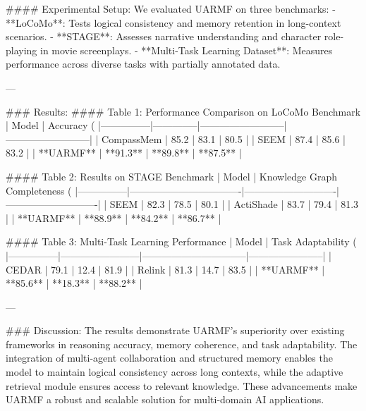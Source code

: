 #### Experimental Setup:
We evaluated UARMF on three benchmarks:
- **LoCoMo**: Tests logical consistency and memory retention in long-context scenarios.
- **STAGE**: Assesses narrative understanding and character role-playing in movie screenplays.
- **Multi-Task Learning Dataset**: Measures performance across diverse tasks with partially annotated data.

---

### Results:
#### Table 1: Performance Comparison on LoCoMo Benchmark
| Model         | Accuracy (%
|---------------|--------------|--------------------------|--------------------------|
| CompassMem    | 85.2         | 83.1                    | 80.5                    |
| SEEM          | 87.4         | 85.6                    | 83.2                    |
| **UARMF**     | **91.3**     | **89.8**                | **87.5**                |

#### Table 2: Results on STAGE Benchmark
| Model         | Knowledge Graph Completeness (%
|---------------|----------------------------------|----------------------------|----------------------------|
| SEEM          | 82.3                            | 78.5                       | 80.1                       |
| ActiShade     | 83.7                            | 79.4                       | 81.3                       |
| **UARMF**     | **88.9**                        | **84.2**                   | **86.7**                   |

#### Table 3: Multi-Task Learning Performance
| Model         | Task Adaptability (%
|---------------|------------------------|--------------------------------|-----------------------|
| CEDAR         | 79.1                  | 12.4                           | 81.9                 |
| Relink        | 81.3                  | 14.7                           | 83.5                 |
| **UARMF**     | **85.6**              | **18.3**                       | **88.2**             |

---

### Discussion:
The results demonstrate UARMF's superiority over existing frameworks in reasoning accuracy, memory coherence, and task adaptability. The integration of multi-agent collaboration and structured memory enables the model to maintain logical consistency across long contexts, while the adaptive retrieval module ensures access to relevant knowledge. These advancements make UARMF a robust and scalable solution for multi-domain AI applications.

